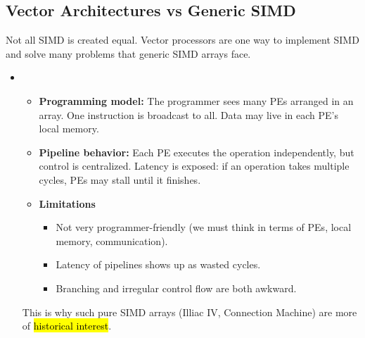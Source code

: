 \subsection{Vector Architectures vs Generic SIMD}

Not all SIMD is created equal. Vector processors are one way to implement SIMD and solve many problems that generic SIMD arrays face.

\begin{itemize}
    \item {}
    \begin{itemize}
        \item[\textcolor{Green3}{\faIcon{book}}] \textcolor{Green3}{\textbf{Programming model:}} The programmer sees many PEs arranged in an array. One instruction is broadcast to all. Data may live in each PE's local memory.
        \item[\textcolor{Green3}{\faIcon{layer-group}}] \textcolor{Green3}{\textbf{Pipeline behavior:}} Each PE executes the operation independently, but control is centralized. Latency is exposed: if an operation takes multiple cycles, PEs may stall until it finishes.
        \item[\textcolor{Red2}{\faIcon{exclamation-triangle}}] \textcolor{Red2}{\textbf{Limitations}}
        \begin{itemize}
            \item[\textcolor{Red2}{\faIcon{times}}] Not very programmer-friendly (we must think in terms of PEs, local memory, communication).
            \item[\textcolor{Red2}{\faIcon{times}}] Latency of pipelines shows up as wasted cycles.
            \item[\textcolor{Red2}{\faIcon{times}}] Branching and irregular control flow are both awkward.
        \end{itemize}
    \end{itemize}
    This is why such pure SIMD arrays (Illiac IV, Connection Machine) are more of \hl{historical interest}.



\end{itemize}
